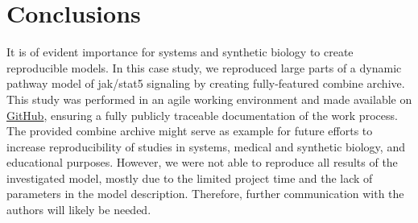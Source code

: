 \section*{Conclusions}
It is of evident importance for systems and synthetic biology to create reproducible models. In this case study, we reproduced large parts of a dynamic pathway model of \ac{jak}/\ac{stat}5 signaling \cite{bachmannmodel} by creating fully-featured \ac{combine} archive. This study was performed in an agile working environment and made available on \hyperlink{https://github.com/ahodelin/Bachmann_Archive}{GitHub}, ensuring a fully publicly traceable documentation of the work process. The provided \ac{combine} archive might serve as example for future efforts to increase reproducibility of studies in systems, medical and synthetic biology, and educational purposes. However, we were not able to reproduce all results of the investigated model, mostly due to the limited project time and the lack of parameters in the model description. Therefore, further communication with the authors will likely be needed.
